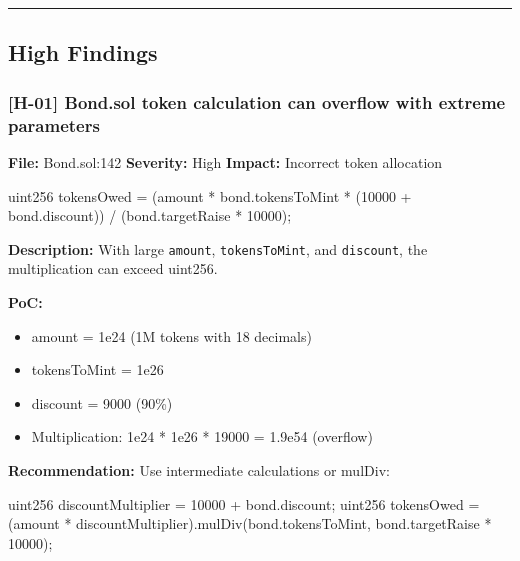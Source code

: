 \documentclass[
]{article}
\newenvironment{Shaded}{}{}
\newcommand{\NormalTok}[1]{#1}
\providecommand{\tightlist}{%
  \setlength{\itemsep}{0pt}\setlength{\parskip}{0pt}}
\begin{document}
\begin{center}\rule{0.5\linewidth}{0.5pt}\end{center}

\subsection{High Findings}\label{high-findings}

\subsubsection{{[}H-01{]} Bond.sol token calculation can overflow with
extreme
parameters}\label{h-01-bondsol-token-calculation-can-overflow-with-extreme-parameters}

\textbf{File:} Bond.sol:142 \textbf{Severity:} High \textbf{Impact:}
Incorrect token allocation

\begin{Shaded}
\begin{Highlighting}[]
\NormalTok{uint256 tokensOwed = (amount * bond.tokensToMint * (10000 + bond.discount)) / (bond.targetRaise * 10000);}
\end{Highlighting}
\end{Shaded}

\textbf{Description:} With large \texttt{amount}, \texttt{tokensToMint},
and \texttt{discount}, the multiplication can exceed uint256.

\textbf{PoC:}

\begin{itemize}
\tightlist
\item
  amount = 1e24 (1M tokens with 18 decimals)
\item
  tokensToMint = 1e26
\item
  discount = 9000 (90\%)
\item
  Multiplication: 1e24 * 1e26 * 19000 = 1.9e54 (overflow)
\end{itemize}

\textbf{Recommendation:} Use intermediate calculations or mulDiv:

\begin{Shaded}
\begin{Highlighting}[]
\NormalTok{uint256 discountMultiplier = 10000 + bond.discount;}
\NormalTok{uint256 tokensOwed = (amount * discountMultiplier).mulDiv(bond.tokensToMint, bond.targetRaise * 10000);}
\end{Highlighting}
\end{Shaded}
\end{document}
